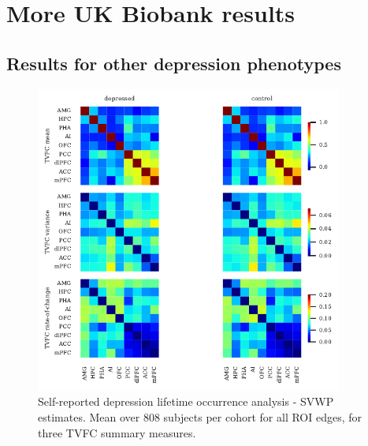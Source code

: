 \chapter{More UK Biobank results}\label{appendix:more-ukb-results}

\section{Results for other depression phenotypes}\label{appendix:more-ukb-results-other-phenotypes}


\begin{figure}[ht]
  \centering
  \includegraphics[width=0.9\textwidth]{fig/ukbiobank/TVFC_predictions_summaries/lifetime_occurrence/cohort_comparison/ROI/correlation_TVFC_estimates_SVWP_joint_joint}
  \caption{
    Self-reported depression lifetime occurrence analysis - SVWP estimates.
    Mean over 808 subjects per cohort for all ROI edges, for three TVFC summary measures.
  }\label{fig:ukb-results-lo-roi-cohort-comparison-full-wp}
\end{figure}


